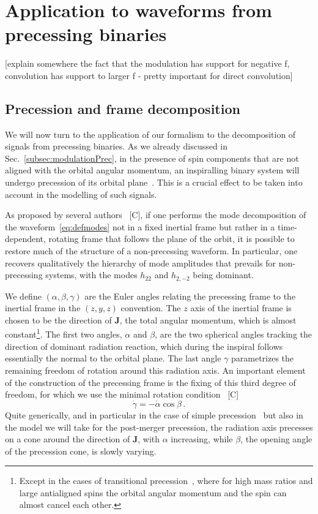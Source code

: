 \documentclass[aps,showpacs,twocolumn,
prd,superscriptaddress,nofootinbib]{revtex4-1}
\newcommand{\be}{\begin{equation}}
\newcommand{\ee}{\end{equation}}
\newcommand{\SM}[1]{{\color{Red} #1}}
\begin{document}

\section{Application to waveforms from precessing binaries}
\label{sec:precession}

\SM{[explain somewhere the fact that the modulation has support for negative f, convolution has support to larger f - pretty important for direct convolution]}


\subsection{Precession and frame decomposition}
\label{subsec:precdef}

We will now turn to the application of our formalism to the decomposition of signals from precessing binaries. As we already discussed in Sec.~\ref{subsec:modulationPrec}, in the presence of spin components that are not aligned with the orbital angular momentum, an inspiralling binary system will undergo precession of its orbital plane~\cite{Apostolatos+94, Kidder95}. This is a crucial effect to be taken into account in the modelling of such signals.

As proposed by several authors~\cite{} \SM{[C]}, if one performs the mode decomposition of the waveform~\eqref{eq:defmodes} not in a fixed inertial frame but rather in a time-dependent, rotating frame that follows the plane of the orbit, it is possible to restore much of the structure of a non-precessing waveform. In particular, one recovers qualitatively the hierarchy of mode amplitudes that prevails for non-precessing systems, with the modes $h_{22}$ and $h_{2,-2}$ being dominant.

We define $(\alpha, \beta, \gamma)$ are the Euler angles relating the precessing frame to the inertial frame in the $(z,y,z)$ convention. The $z$ axis of the inertial frame is chosen to be the direction of $\bm{J}$, the total angular momentum, which is almost constant\footnote{Except in the cases of transitional precession~\cite{Apostolatos94}, where for high mass ratios and large antialigned spins the orbital angular momentum and the spin can almost cancel each other.}. The first two angles, $\alpha$ and $\beta$, are the two spherical angles tracking the direction of dominant radiation reaction, which during the inspiral follows essentially the normal to the orbital plane. The last angle $\gamma$ parametrizes the remaining freedom of rotation around this radiation axis. An important element of the construction of the precessing frame is the fixing of this third degree of freedom, for which we use the minimal rotation condition~\cite{} \SM{[C]}
\be\label{eq:gammadot}
	\dot{\gamma} = -\dot{\alpha}\cos \beta \,.
\ee
Quite generically, and in particular in the case of simple precession~\cite{Apostolatos+94, Kidder95} but also in the model we will take for the post-merger precession, the radiation axis precesses on a cone around the direction of $\bm{J}$, with $\alpha$ increasing, while $\beta$, the opening angle of the precession cone, is slowly varying.
\end{document}

